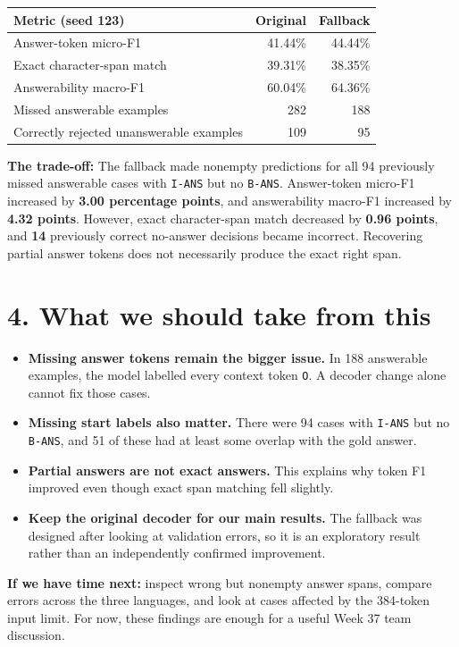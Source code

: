 \documentclass[11pt,a4paper]{article}
\begin{document}
\begin{center}
\begin{tabular}{p{8cm}rr}
\hline
\textbf{Metric (seed 123)} & \textbf{Original} & \textbf{Fallback} \\
\hline
Answer-token micro-F1 & 41.44\% & 44.44\% \\
Exact character-span match & 39.31\% & 38.35\% \\
Answerability macro-F1 & 60.04\% & 64.36\% \\
Missed answerable examples & 282 & 188 \\
Correctly rejected unanswerable examples & 109 & 95 \\
\hline
\end{tabular}
\end{center}

\textbf{The trade-off:} The fallback made nonempty predictions for all 94 previously missed answerable cases with \texttt{I-ANS} but no \texttt{B-ANS}. Answer-token micro-F1 increased by \textbf{3.00 percentage points}, and answerability macro-F1 increased by \textbf{4.32 points}. However, exact character-span match decreased by \textbf{0.96 points}, and \textbf{14} previously correct no-answer decisions became incorrect. Recovering partial answer tokens does not necessarily produce the exact right span.

\section*{4. What we should take from this}

\begin{itemize}

\item \textbf{Missing answer tokens remain the bigger issue.} In 188 answerable examples, the model labelled every context token \texttt{O}. A decoder change alone cannot fix those cases.

\item \textbf{Missing start labels also matter.} There were 94 cases with \texttt{I-ANS} but no \texttt{B-ANS}, and 51 of these had at least some overlap with the gold answer.

\item \textbf{Partial answers are not exact answers.} This explains why token F1 improved even though exact span matching fell slightly.

\item \textbf{Keep the original decoder for our main results.} The fallback was designed after looking at validation errors, so it is an exploratory result rather than an independently confirmed improvement.

\end{itemize}

\textbf{If we have time next:} inspect wrong but nonempty answer spans, compare errors across the three languages, and look at cases affected by the 384-token input limit. For now, these findings are enough for a useful Week 37 team discussion.
\end{document}
